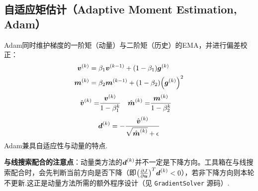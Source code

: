 \documentclass[UTF8]{article}
\numberwithin{equation}{section}
\begin{document}
        \subsection{自适应矩估计（Adaptive Moment Estimation, Adam）}
            Adam同时维护梯度的一阶矩（动量）与二阶矩（历史）的EMA，并进行偏差校正：
            \begin{align}
                \vb*{v}^\pqty{k}&=\beta_1\vb*{v}^\pqty{k-1}+\pqty{1-\beta_1}\vb*{g}^\pqty{k}\\
                \vb*{m}^\pqty{k}&=\beta_2\vb*{m}^\pqty{k-1}+\pqty{1-\beta_2}\pqty{\vb*{g}^\pqty{k}}^2
            \end{align}
            \begin{align}
                \hat{\vb*{v}}^\pqty{k}=&\frac{\vb*{v}^\pqty{k}}{1-\beta_1^k} &
                \hat{\vb*{m}}^\pqty{k}=&\frac{\vb*{m}^\pqty{k}}{1-\beta_2^k}
            \end{align}
            \begin{align}
                \vb*{d}^\pqty{k}=-\frac{\hat{\vb*{v}}^\pqty{k}}{\sqrt{\hat{\vb*{m}}^\pqty{k}}+\epsilon}
            \end{align}
            Adam兼具自适应性与动量的特点.
        \par
        \textbf{与线搜索配合的注意点}：动量类方法的$\vb*{d}^\pqty{k}$并不一定是下降方向。工具箱在与线搜索配合时，会先判断当前方向是否下降（即$\pqty{\pdv{J}{\vb*{u}}}^{T}\vb*{d}^\pqty{k}<0$），若非下降方向则本轮不更新.这正是动量方法所需的额外程序设计（见 \texttt{GradientSolver} 源码）.
\end{document}
